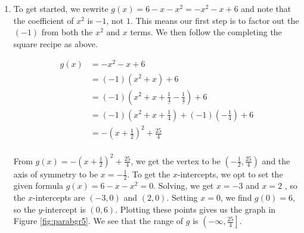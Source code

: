 {\begin{enumerate}
Of course, we can always check our answer by multiplying out $f(x) = (x-2)^2 -1$ to see that it simplifies to $f(x) = x^2 - 4x - 1$. In the form $f(x) = (x-2)^2-1$, we readily find the vertex to be $(2,-1)$ which makes the axis of symmetry $x = 2$.  To find the $x$-intercepts, we set $y = f(x) = 0$.  We are spoiled for choice, since we have \textit{two} formulas for $f(x)$.  Since we recognize $f(x) = x^2-4x+3$ to be easily factorable, (experience pays off, here!) we proceed to solve $x^2-4x+3 = 0$.  Factoring gives $(x-3)(x-1) = 0$ so that $x = 3$ or $x=1$.  The $x$-intercepts are then $(1,0)$ and $(3,0)$.  To find the $y$-intercept, we set $x=0$.  Once again, the general form $f(x) = x^2-4x+3$ is easiest to work with here,  and we find $y = f(0) = 3$.  Hence, the $y$-intercept is $(0,3)$.  With the vertex, axis of symmetry and the intercepts, we get a pretty good graph without the need to plot additional points.  We see that the range of $f$ is $[-1,\infty)$ and we are done. The graph of $f$ is given in Figure \ref{fig:parabgr4}.

\item  To get started, we rewrite $g(x) = 6-x-x^2 = -x^2-x+6$ and note that the coefficient of $x^2$ is $-1$, not $1$.  This means our first step is to factor out the $(-1)$ from both the $x^2$ and $x$ terms.  We then follow the completing the square recipe as above. 

\begin{align*}
g(x) & =  -x^2-x+6  \\
	   & = (-1)\left(x^2 + x \right) + 6  \tag*{(Factor the coefficient of $x^2$ from $x^2$ and $x$.)} \\
		 & = (-1)\left(x^2 + x + \underline{\frac{1}{4}} - \underline{\frac{1}{4}} \right) + 6  \\
		 & =  (-1)\left(x^2 + x + \frac{1}{4}\right) + (-1)\left(-\frac{1}{4}\right) + 6  \tag*{(Group the perfect square trinomial.)}\\
		  & =  -\left(x +\frac{1}{2}\right)^2 + \frac{25}{4} \\
\end{align*}


From $g(x) =  -\left(x +\frac{1}{2}\right)^2 + \frac{25}{4}$, we get the vertex to be $\left(-\frac{1}{2}, \frac{25}{4}\right)$ and the axis of symmetry to be $x = -\frac{1}{2}$.  To get the $x$-intercepts, we opt to set the given formula $g(x) = 6-x-x^2 = 0$.  Solving, we get $x = -3$ and $x=2$ , so the $x$-intercepts are $(-3,0)$ and $(2,0)$.  Setting $x=0$, we find $g(0) = 6$, so the $y$-intercept is $(0,6)$. Plotting these points gives us the graph in Figure \ref{fig:parabgr5}.  We see that the range of $g$ is $\left(-\infty, \frac{25}{4}\right]$.
\end{enumerate}
}

